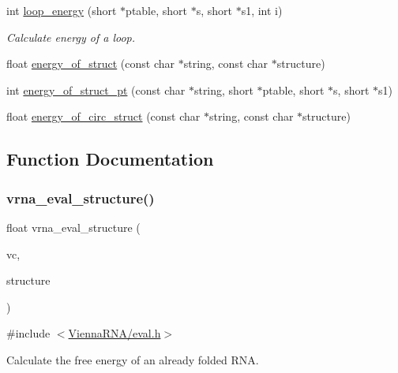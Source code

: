 \begin{DoxyCompactItemize}
int \mbox{\hyperlink{group__eval_ga507d4fd93f4b398d793ba2402731388d}{loop\+\_\+energy}} (short $\ast$ptable, short $\ast$s, short $\ast$s1, int i)
\begin{DoxyCompactList}\small\item\em Calculate energy of a loop. \end{DoxyCompactList}\item 
float \mbox{\hyperlink{group__eval_gac2b37fea2145c94d925a3f33378ef87b}{energy\+\_\+of\+\_\+struct}} (const char $\ast$string, const char $\ast$structure)
\item 
int \mbox{\hyperlink{group__eval_ga27ce6f68512d43bf1fe14a06c9d76d5c}{energy\+\_\+of\+\_\+struct\+\_\+pt}} (const char $\ast$string, short $\ast$ptable, short $\ast$s, short $\ast$s1)
\item 
float \mbox{\hyperlink{group__eval_ga657222e2758c46bf13b416ef3032e417}{energy\+\_\+of\+\_\+circ\+\_\+struct}} (const char $\ast$string, const char $\ast$structure)
\end{DoxyCompactItemize}


\subsection{Function Documentation}
\mbox{\label{group__eval_ga58f199f1438d794a265f3b27fc8ea631}} 
\subsubsection{\texorpdfstring{vrna\+\_\+eval\+\_\+structure()}{vrna\_eval\_structure()}}
{\footnotesize\ttfamily float vrna\+\_\+eval\+\_\+structure (\begin{DoxyParamCaption}\item[{\mbox{\hyperlink{group__fold__compound_ga1b0cef17fd40466cef5968eaeeff6166}{vrna\+\_\+fold\+\_\+compound\+\_\+t}} $\ast$}]{vc,  }\item[{const char $\ast$}]{structure }\end{DoxyParamCaption})}



{\ttfamily \#include $<$\mbox{\hyperlink{eval_8h}{Vienna\+R\+N\+A/eval.\+h}}$>$}



Calculate the free energy of an already folded R\+NA. 

